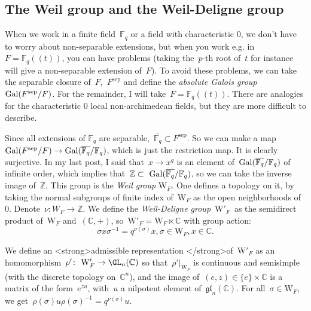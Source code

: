 \subsection{The Weil group and the Weil-Deligne group}
When we work in a finite field~$\mathbb{F}_q$ or a field with characteristic 0, we don't have to worry about non-separable extensions, but when you work e.g. in~$F = \mathbb{F}_q (\!(t)\!)$, you can have problems (taking the~$p$-th root of~$t$ for instance will give a non-separable extension of~$F$). To avoid these problems, we can take the separable closure of~$F$,~$F^{\textrm{sep}}$ and define the \emph{absolute Galois group} $\operatorname{Gal}(F^{\textrm{sep}}/F)$. For the remainder, I will take~$F = \mathbb{F}_q (\!(t)\!)$. There are analogies for the characteristic 0 local non-archimedean fields, but they are more difficult to describe.

Since all extensions of $\mathbb{F}_q$ are separable,~$\overline{ \mathbb{F}_q} \subset F^{\textrm{sep}}$. So we can make a map~$\operatorname{Gal}(F^{\textrm{sep}}/F) \rightarrow \operatorname{Gal}(\overline{ \mathbb{F}_q} /\mathbb{F}_q)$, which is just the restriction map. It is clearly surjective. In my last post, I said that~$x \rightarrow x^q$ is an element of~$\operatorname{Gal}(\overline{ \mathbb{F}_q} /\mathbb{F}_q)$ of infinite order, which implies that~$\mathbb{Z} \subset \Gal(\overline{ \mathbb{F}_q} /\mathbb{F}_q)$, so we can take the inverse image of~$\mathbb{Z}$. This group is the \emph{Weil group} $\mathrm{W}_F$. One defines a topology on it, by taking the normal subgroups of finite index of~$\mathrm{W}_F$ as the open neighborhoods of~$0$. Denote~$\nu: W_F \rightarrow \mathbb{Z}$. We define the \emph{Weil-Deligne group}~$\mathrm{W}'_F$ as the semidirect product of~$\mathrm{W}_F$ and~$(\mathbb{C},+)$, so~$\mathrm{W}'_F = \mathrm{W}_F \ltimes \mathbb{C}$ with group action:
\begin{equation}
  \sigma x \sigma^{-1} = q^{\nu(\sigma)}x, \sigma \in \mathrm{W}_F, x \in \mathbb{C}.
\end{equation}

We define an <strong>admissible representation </strong>of~$\mathrm{W}'_F$ as an homomorphism~$\rho'\colon \mathrm{W}'_F \rightarrow \GL_n(\mathbb{C})$ so that~$\rho'|_{\mathrm{W}_F}$ is continuous and semisimple (with the discrete topology on~$\mathbb{C}^n$), and the image of~$(e,z) \in \{e\}\times\mathbb{C}$ is a matrix of the form~$e^{zu}$, with~$u$ a nilpotent element of~$\mathfrak{gl}_n(\mathbb{C})$. For all~$\sigma \in \mathrm{W}_F$, we get~$\rho(\sigma)u\rho(\sigma)^{-1} = q^{\nu(\sigma)}u$.

